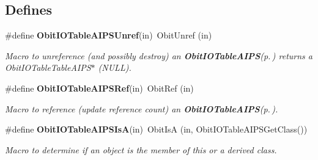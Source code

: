 \subsection*{Defines}
\begin{CompactItemize}
\item 
\#define {\bf Obit\-IOTable\-AIPSUnref}(in)\ Obit\-Unref (in)
\begin{CompactList}\small\item\em Macro to unreference (and possibly destroy) an {\bf Obit\-IOTable\-AIPS}{\rm (p.\,\pageref{structObitIOTableAIPS})} returns a Obit\-IOTable\-Table\-AIPS$\ast$ (NULL). \item\end{CompactList}\item 
\#define {\bf Obit\-IOTable\-AIPSRef}(in)\ Obit\-Ref (in)
\begin{CompactList}\small\item\em Macro to reference (update reference count) an {\bf Obit\-IOTable\-AIPS}{\rm (p.\,\pageref{structObitIOTableAIPS})}. \item\end{CompactList}\item 
\#define {\bf Obit\-IOTable\-AIPSIs\-A}(in)\ Obit\-Is\-A (in, Obit\-IOTable\-AIPSGet\-Class())
\begin{CompactList}\small\item\em Macro to determine if an object is the member of this or a derived class. \item\end{CompactList}\end{CompactItemize}
